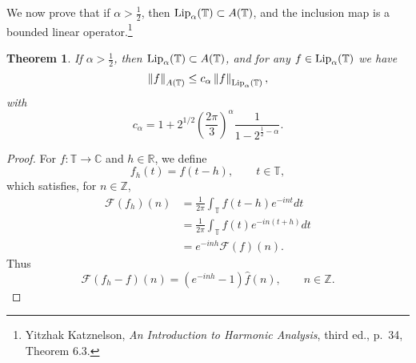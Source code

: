 \documentclass{article}
\newcommand{\Lip}{\ensuremath\mathrm{Lip}}
\newcommand{\norm}[1]{\left\Vert #1 \right\Vert}
\newtheorem{theorem}{Theorem}
\theoremstyle{definition}
\begin{document}
We now prove that if $\alpha>\frac{1}{2}$, then 
$\Lip_\alpha(\mathbb{T}) \subset A(\mathbb{T})$, and the inclusion map is a bounded linear operator.\footnote{Yitzhak Katznelson, {\em An Introduction to Harmonic Analysis}, third ed., p.~34, Theorem 6.3.}

\begin{theorem}
If $\alpha>\frac{1}{2}$, 
then $\Lip_\alpha(\mathbb{T}) \subset A(\mathbb{T})$, and
for any $f \in \Lip_\alpha(\mathbb{T})$ we have
\[
\norm{f}_{A(\mathbb{T})} \leq c_\alpha \norm{f}_{\Lip_\alpha(\mathbb{T})},
\]
with
\[
c_\alpha = 1+ 2^{1/2} \left( \frac{2\pi}{3} \right)^\alpha  \frac{1}{1-2^{\frac{1}{2}-\alpha}}.
\]
\end{theorem}
\begin{proof}
For $f:\mathbb{T} \to \mathbb{C}$ and $h \in \mathbb{R}$, we define
\[
f_h(t)=f(t-h), \qquad t \in \mathbb{T},
\]
which satisfies, for $n \in \mathbb{Z}$,
\begin{align*}
\mathscr{F}(f_h)(n)&=\frac{1}{2\pi} \int_{\mathbb{T}} f(t-h) e^{-int} dt\\
&=\frac{1}{2\pi} \int_{\mathbb{T}} f(t) e^{-in(t+h)} dt\\
&=e^{-inh} \mathscr{F}(f)(n).
\end{align*}
Thus
\begin{equation}
\mathscr{F}(f_h-f)(n) = (e^{-inh}-1)\hat{f}(n), \qquad n \in \mathbb{Z}.
\label{translation}
\end{equation}



\end{proof}
\end{document}
